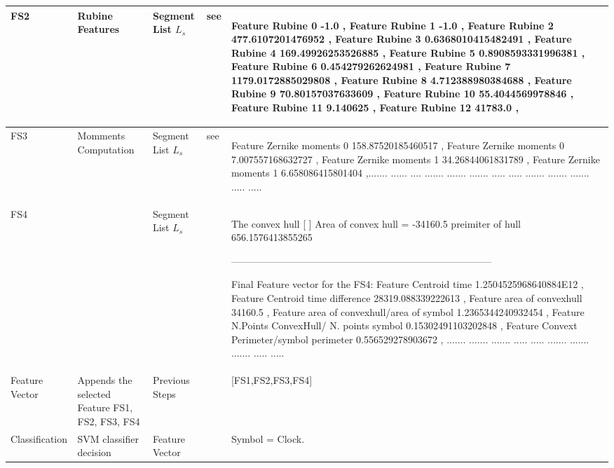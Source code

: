 \begin{landscape}
\begin{scriptsize}
\begin{longtable}{|p{2cm}|p{2cm}|p{5cm}|p{2cm}|p{10cm}|}
 \\ \hline
FS2  & Rubine Features & Segment List $L_s$  &   see \cite{gestureexample12}   & 
\begin{scriptsize}
 Feature Rubine 0 -1.0   ,    Feature Rubine 1 -1.0   ,    Feature Rubine 2 477.6107201476952   ,    Feature Rubine 3 0.6368010415482491   ,    Feature Rubine 4 169.49926253526885   ,    Feature Rubine 5 0.8908593331996381   ,    Feature Rubine 6 0.454279262624981   ,    Feature Rubine 7 1179.0172885029808   ,    Feature Rubine 8 4.712388980384688   ,    Feature Rubine 9 70.80157037633609   ,    Feature Rubine 10 55.4044569978846   ,    Feature Rubine 11 9.140625   ,    Feature Rubine 12 41783.0   ,   
\end{scriptsize}
 \\ \hline
 
FS3 & Momments Computation   &  Segment List $L_s$  &  see \cite{zernike61}  &

\begin{scriptsize}
   Feature Zernike moments 0 158.87520185460517   ,    Feature Zernike moments 0 7.007557168632727   ,    Feature Zernike moments 1 34.26844061831789   ,    Feature Zernike moments 1 6.658086415801404   ,....... ...... .... ....... ....... ....... ..... ..... ....... ....... ....... ..... .....
\end{scriptsize}
  
  \\ \hline
FS4   &  &Segment List $L_s$   &  &  \begin{scriptsize} 
 The convex hull    [ ]
 Area of convex hull =  -34160.5   preimiter of hull 656.1576413855265
 
 --------------------------------------------------------------------------------
 
Final Feature vector for the FS4: 
  Feature Centroid time 1.2504525968640884E12  , Feature Centroid time difference 28319.088339222613   ,    Feature area of convexhull 34160.5   ,    Feature area of convexhull/area of symbol 1.2365344240932454   ,    Feature N.Points ConvexHull/ N. points symbol 0.15302491103202848   ,    Feature Convext Perimeter/symbol perimeter 0.556529278903672   ,    ....... ....... ....... ..... ..... ....... ....... ....... ..... .....
  \end{scriptsize}
    \\ \hline
 Feature Vector & Appends the selected Feature FS1, FS2, FS3, FS4 & Previous Steps  & & 
 
  [FS1,FS2,FS3,FS4]  \\ \hline
   Classification  & SVM classifier decision & Feature Vector  &  & 
   Symbol = Clock.  
 
 \\ \hline
   
 		\end{longtable}


\end{scriptsize}
\end{landscape}